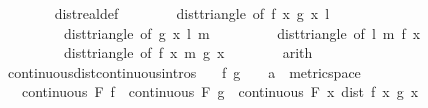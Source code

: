 \begin{isabellebody}
\ \ \ \ \ \ \isamarkupfalse%
\ dist{\isacharunderscore}{\kern0pt}real{\isacharunderscore}{\kern0pt}def\isanewline
\ \ \ \ \ \ \isamarkupfalse%
\ dist{\isacharunderscore}{\kern0pt}triangle{}\ {\isacharbrackleft}{\kern0pt}of\ {\isachardoublequoteopen}f\ x{\isachardoublequoteclose}\ {\isachardoublequoteopen}g\ x{\isachardoublequoteclose}\ {\isachardoublequoteopen}l{\isachardoublequoteclose}{\isacharbrackright}{\kern0pt}\isanewline
\ \ \ \ \ \ \ \ \ dist{\isacharunderscore}{\kern0pt}triangle{}\ {\isacharbrackleft}{\kern0pt}of\ {\isachardoublequoteopen}g\ x{\isachardoublequoteclose}\ {\isachardoublequoteopen}l{\isachardoublequoteclose}\ {\isachardoublequoteopen}m{\isachardoublequoteclose}{\isacharbrackright}{\kern0pt}\isanewline
\ \ \ \ \ \ \ \ \ dist{\isacharunderscore}{\kern0pt}triangle{}\ {\isacharbrackleft}{\kern0pt}of\ {\isachardoublequoteopen}l{\isachardoublequoteclose}\ {\isachardoublequoteopen}m{\isachardoublequoteclose}\ {\isachardoublequoteopen}f\ x{\isachardoublequoteclose}{\isacharbrackright}{\kern0pt}\isanewline
\ \ \ \ \ \ \ \ \ dist{\isacharunderscore}{\kern0pt}triangle\ {\isacharbrackleft}{\kern0pt}of\ {\isachardoublequoteopen}f\ x{\isachardoublequoteclose}\ {\isachardoublequoteopen}m{\isachardoublequoteclose}\ {\isachardoublequoteopen}g\ x{\isachardoublequoteclose}{\isacharbrackright}{\kern0pt}\isanewline
\ \ \ \ \ \ \isamarkupfalse%
\ arith\isanewline
\ \ \isamarkupfalse%
\isanewline
{}\isamarkupfalse%
%
\endisatagproof
{\isafoldproof}%
%
\isadelimproof
\isanewline
%
\endisadelimproof
\isanewline
{}\isamarkupfalse%
\ continuous{\isacharunderscore}{\kern0pt}dist{\isacharbrackleft}{\kern0pt}continuous{\isacharunderscore}{\kern0pt}intros{\isacharbrackright}{\kern0pt}{\isacharcolon}{\kern0pt}\isanewline
\ \ \ f\ g\ {\isacharcolon}{\kern0pt}{\isacharcolon}{\kern0pt}\ {\isachardoublequoteopen}{\isacharunderscore}{\kern0pt}\ {\isasymRightarrow}\ {\isacharprime}{\kern0pt}a\ {\isacharcolon}{\kern0pt}{\isacharcolon}{\kern0pt}\ metric{\isacharunderscore}{\kern0pt}space{\isachardoublequoteclose}\isanewline
\ \ \ {\isachardoublequoteopen}continuous\ F\ f\ {\isasymLongrightarrow}\ continuous\ F\ g\ {\isasymLongrightarrow}\ continuous\ F\ {\isacharparenleft}{\kern0pt}{\isasymlambda}x{\isachardot}{\kern0pt}\ dist\ {\isacharparenleft}{\kern0pt}f\ x{\isacharparenright}{\kern0pt}\ {\isacharparenleft}{\kern0pt}g\ x{\isacharparenright}{\kern0pt}{\isacharparenright}{\kern0pt}{\isachardoublequoteclose}\isanewline

\end{isabellebody}
